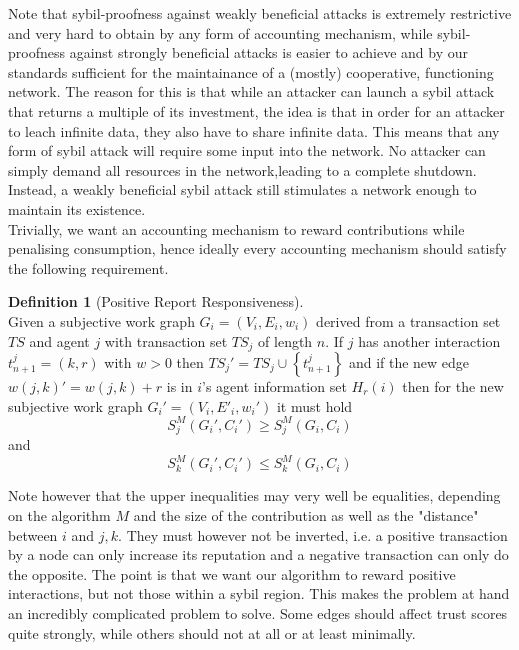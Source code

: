 \documentclass[11pt,a4paper]{article}
\theoremstyle{definition}
\newtheorem{definition}{Definition}[section]
\theoremstyle{theorem}
\theoremstyle{proposition}
\theoremstyle{corollary}
\theoremstyle{lemma}
\theoremstyle{example}
\theoremstyle{remark}
\begin{document}
\noindent{}Note that sybil-proofness against weakly beneficial attacks is extremely restrictive and very hard to obtain by any form of accounting mechanism, while sybil-proofness against strongly beneficial attacks is easier to achieve and by our standards sufficient for the maintainance of a (mostly) cooperative, functioning network. The reason for this is that while an attacker can launch a sybil attack that returns a multiple of its investment, the idea is that in order for an attacker to leach infinite data, they also have to share infinite data. This means that any form of sybil attack will require some input into the network. No attacker can simply demand all resources in the network,leading to a complete shutdown. Instead, a weakly beneficial sybil attack still stimulates a network enough to maintain its existence. \vspace{1em}\\

\noindent{}Trivially, we want an accounting mechanism to reward contributions while penalising consumption, hence ideally every accounting mechanism should satisfy the following requirement.

\begin{definition}[Positive Report Responsiveness]\ \\
Given a subjective work graph $G_i=(V_i,E_i,w_i)$ derived from a transaction set $TS$ and agent $j$ with transaction set $TS_j$ of length $n$. If $j$ has another interaction $t^j_{n+1}=(k,r)$ with $w>0$ then $TS_j'=TS_j\cup\left\lbrace{}t^j_{n+1}\right\rbrace$ and if the new edge $w(j,k)'=w(j,k)+r$ is in $i$'s agent information set $H_r(i)$ then for the new subjective work graph $G_i'=(V_i,E'_i,w_i')$ it must hold
\[
S^M_j(G_i',C_i')\geq{}S^M_j(G_i,C_i)
\]
and
\[
S^M_k(G_i',C_i')\leq{}S^M_k(G_i,C_i)
\]
\end{definition}

\noindent{}Note however that the upper inequalities may very well be equalities, depending on the algorithm $M$ and the size of the contribution as well as the "distance" between $i$ and $j,k$. They must however not be inverted, i.e. a positive transaction by a node can only increase its reputation and a negative transaction can only do the opposite. The point is that we want our algorithm to reward positive interactions, but not those within a sybil region. This makes the problem at hand an incredibly complicated problem to solve. Some edges should affect trust scores quite strongly, while others should not at all or at least minimally. \vspace{1em}\\
\end{document}

